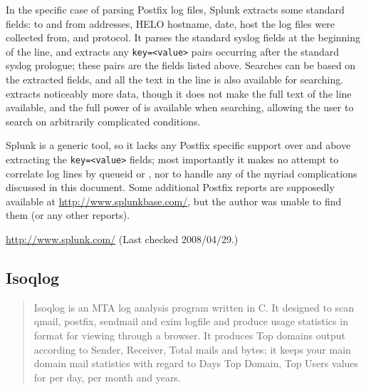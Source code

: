 In the specific case of parsing Postfix log files, Splunk extracts some
standard fields: to and from addresses, HELO hostname, date, host the log
files were collected from, and protocol.  It parses the standard syslog
fields at the beginning of the line, and extracts any \texttt{key=<value>}
pairs occurring after the standard syslog prologue; these pairs are the
fields listed above.  Searches can be based on the extracted fields, and
all the text in the line is also available for searching.  \parsername{}
extracts noticeably more data, though it does not make the full text of the
line available, and the full power of \SQL{} is available when searching,
allowing the user to search on arbitrarily complicated conditions.

Splunk is a generic tool, so it lacks any Postfix specific support over and
above extracting the \texttt{key=<value>} fields; most importantly it makes
no attempt to correlate log lines by queueid or \pid{}, nor to handle any
of the myriad complications discussed in this document.  Some additional
Postfix reports are supposedly available at
\url{http://www.splunkbase.com/}, but the author was unable to find them
(or any other reports).

\url{http://www.splunk.com/} \newline (Last checked 2008/04/29.)

\subsection{Isoqlog}

\begin{quotation}

    Isoqlog is an MTA log analysis program written in C. It designed to
    scan qmail, postfix, sendmail and exim logfile and produce usage
    statistics in \HTML{} format for viewing through a browser. It produces
    Top domains output according to Sender, Receiver, Total mails and
    bytes; it keeps your main domain mail statistics with regard to Days
    Top Domain, Top Users values for per day, per month and years.

\end{quotation}

